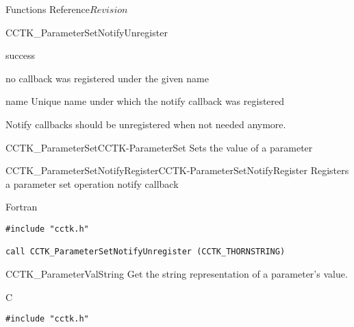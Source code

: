 \begin{cactuspart}{ Functions Reference}{}{$Revision$}
\begin{FunctionDescription}{CCTK\_ParameterSetNotifyUnregister}
\begin{ResultSection}
\begin{Result}{0}
success
\end{Result}
\begin{Result}{-1}
no callback was registered under the given name
\end{Result}
\end{ResultSection}

\begin{ParameterSection}
\begin{Parameter}{name}
Unique name under which the notify callback was registered
\end{Parameter}
\end{ParameterSection}

\begin{Discussion}
Notify callbacks should be unregistered when not needed anymore.
\end{Discussion}

\begin{SeeAlsoSection}
\begin{SeeAlso2}{CCTK\_ParameterSet}{CCTK-ParameterSet}
  Sets the value of a parameter
\end{SeeAlso2}
\begin{SeeAlso2}{CCTK\_ParameterSetNotifyRegister}{CCTK-ParameterSetNotifyRegister}
  Registers a parameter set operation notify callback
\end{SeeAlso2}
\end{SeeAlsoSection}

\begin{ExampleSection}
\begin{Example}{Fortran}
\begin{verbatim}
#include "cctk.h"

call CCTK_ParameterSetNotifyUnregister (CCTK_THORNSTRING)
\end{verbatim}
\end{Example}
\end{ExampleSection}
\end{FunctionDescription}


\begin{FunctionDescription}{CCTK\_ParameterValString}
\label{CCTK-ParameterValString}
Get the string representation of a parameter's value.

\begin{SynopsisSection}
\begin{Synopsis}{C}
\begin{verbatim}
#include "cctk.h"


\end{verbatim}
\end{Synopsis}
\end{SynopsisSection}
\end{FunctionDescription}
\end{cactuspart}
